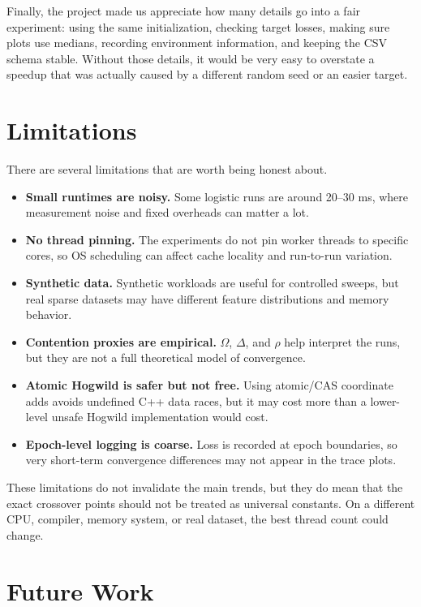 \documentclass[11pt]{article}
\begin{document}
Finally, the project made us appreciate how many details go into a fair experiment: using the same initialization, checking target losses, making sure plots use medians, recording environment information, and keeping the CSV schema stable. Without those details, it would be very easy to overstate a speedup that was actually caused by a different random seed or an easier target.

\section{Limitations}

There are several limitations that are worth being honest about.

\begin{itemize}
  \item \textbf{Small runtimes are noisy.} Some logistic runs are around 20--30 ms, where measurement noise and fixed overheads can matter a lot.
  \item \textbf{No thread pinning.} The experiments do not pin worker threads to specific cores, so OS scheduling can affect cache locality and run-to-run variation.
  \item \textbf{Synthetic data.} Synthetic workloads are useful for controlled sweeps, but real sparse datasets may have different feature distributions and memory behavior.
  \item \textbf{Contention proxies are empirical.} \(\Omega\), \(\Delta\), and \(\rho\) help interpret the runs, but they are not a full theoretical model of convergence.
  \item \textbf{Atomic Hogwild is safer but not free.} Using atomic/CAS coordinate adds avoids undefined C++ data races, but it may cost more than a lower-level unsafe Hogwild implementation would cost.
  \item \textbf{Epoch-level logging is coarse.} Loss is recorded at epoch boundaries, so very short-term convergence differences may not appear in the trace plots.
\end{itemize}

These limitations do not invalidate the main trends, but they do mean that the exact crossover points should not be treated as universal constants. On a different CPU, compiler, memory system, or real dataset, the best thread count could change.

\section{Future Work}
\end{document}
